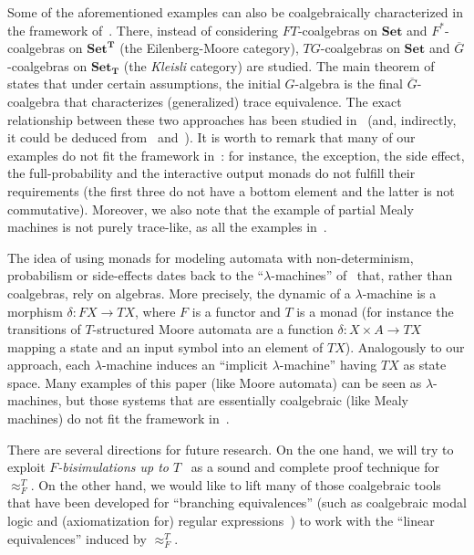 \documentclass{LMCS}
\def\T{\mathbf{T}}
\def\Set{\mathbf{Set}}
\begin{document}
\medskip

Some of the aforementioned examples can also be coalgebraically
characterized in the framework of~\cite{HJS,HasuoThesis}. There, instead of
considering $FT$-coalgebras on $\Set$ and $F^*$-coalgebras on
$\Set^{\T}$ (the Eilenberg-Moore category), $TG$-coalgebras on
$\Set$ and $\overline{G}$-coalgebras on $\Set_{\T}$ (the
\emph{Kleisli} category) are studied. The main theorem of~\cite{HJS}
states that under certain assumptions, the initial $G$-algebra is
the final $\overline{G}$-coalgebra that characterizes (generalized)
trace equivalence. The exact relationship between these two approaches has been studied in~\cite{JSS} 
(and, indirectly, it could be deduced from~\cite{BK} and~\cite{KK}). 
It is  worth to remark that many of our examples do not fit the framework in~\cite{HJS}: for instance, the exception, the
side effect, the full-probability and the interactive output monads do not fulfill their
requirements (the first three do not have a bottom element and the
latter is not commutative). Moreover, we also note
that the example of partial Mealy machines is not purely trace-like,
as all the examples in~\cite{HJS}.



The idea of using monads for modeling automata with non-determinism, 
probabilism or side-effects dates back to the ``$\lambda$-machines'' of~\cite{AM75} that, rather than coalgebras, rely on algebras. 
More precisely, the dynamic of a $\lambda$-machine is a morphism 
$\delta \colon FX \to TX$, where $F$ is a functor and $T$ is a monad (for instance the transitions of $T$-structured Moore automata are 
a function $\delta \colon X \times A \to TX$ mapping a state and an input symbol into an element of $TX$).
Analogously to our approach, each $\lambda$-machine induces an ``implicit $\lambda$-machine'' having $TX$ as state space. Many examples of this paper (like Moore automata) can be seen as $\lambda$-machines, but those systems that are essentially coalgebraic (like Mealy machines) 
do not fit the framework in~\cite{AM75}. 



\medskip

There are several directions for future research. On the one hand, we
will try to exploit \emph{$F$-bisimulations up to $T$}~\cite{Lenisa99,LenisaPW00}
as a sound and complete proof technique for $\approx_F^T$.
On the other hand, we would like to lift many of those coalgebraic
tools that have been developed for ``branching equivalences'' (such
as coalgebraic modal logic \cite{ml,Lutz_expressivity} and
(axiomatization for) regular expressions~\cite{BRS09b}) to work with
the ``linear equivalences'' induced by $\approx_F^T$.
\end{document}
